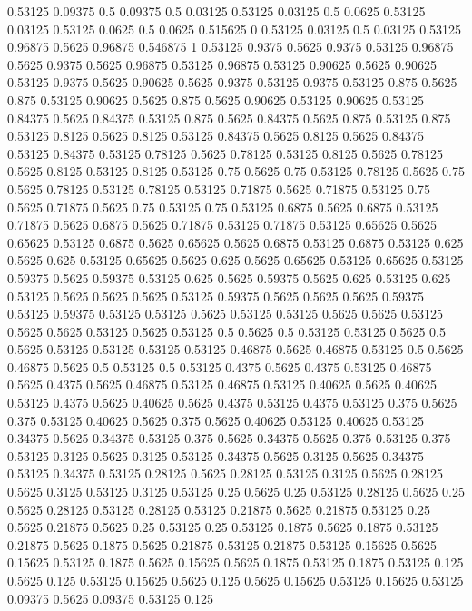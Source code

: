 0.53125 0.09375
0.5 0.09375
0.5 0.03125
0.53125 0.03125
0.5 0.0625
0.53125 0.03125
0.53125 0.0625
0.5 0.0625
0.515625 0
0.53125 0.03125
0.5 0.03125
0.53125 0.96875
0.5625 0.96875
0.546875 1
0.53125 0.9375
0.5625 0.9375
0.53125 0.96875
0.5625 0.9375
0.5625 0.96875
0.53125 0.96875
0.53125 0.90625
0.5625 0.90625
0.53125 0.9375
0.5625 0.90625
0.5625 0.9375
0.53125 0.9375
0.53125 0.875
0.5625 0.875
0.53125 0.90625
0.5625 0.875
0.5625 0.90625
0.53125 0.90625
0.53125 0.84375
0.5625 0.84375
0.53125 0.875
0.5625 0.84375
0.5625 0.875
0.53125 0.875
0.53125 0.8125
0.5625 0.8125
0.53125 0.84375
0.5625 0.8125
0.5625 0.84375
0.53125 0.84375
0.53125 0.78125
0.5625 0.78125
0.53125 0.8125
0.5625 0.78125
0.5625 0.8125
0.53125 0.8125
0.53125 0.75
0.5625 0.75
0.53125 0.78125
0.5625 0.75
0.5625 0.78125
0.53125 0.78125
0.53125 0.71875
0.5625 0.71875
0.53125 0.75
0.5625 0.71875
0.5625 0.75
0.53125 0.75
0.53125 0.6875
0.5625 0.6875
0.53125 0.71875
0.5625 0.6875
0.5625 0.71875
0.53125 0.71875
0.53125 0.65625
0.5625 0.65625
0.53125 0.6875
0.5625 0.65625
0.5625 0.6875
0.53125 0.6875
0.53125 0.625
0.5625 0.625
0.53125 0.65625
0.5625 0.625
0.5625 0.65625
0.53125 0.65625
0.53125 0.59375
0.5625 0.59375
0.53125 0.625
0.5625 0.59375
0.5625 0.625
0.53125 0.625
0.53125 0.5625
0.5625 0.5625
0.53125 0.59375
0.5625 0.5625
0.5625 0.59375
0.53125 0.59375
0.53125 0.53125
0.5625 0.53125
0.53125 0.5625
0.5625 0.53125
0.5625 0.5625
0.53125 0.5625
0.53125 0.5
0.5625 0.5
0.53125 0.53125
0.5625 0.5
0.5625 0.53125
0.53125 0.53125
0.53125 0.46875
0.5625 0.46875
0.53125 0.5
0.5625 0.46875
0.5625 0.5
0.53125 0.5
0.53125 0.4375
0.5625 0.4375
0.53125 0.46875
0.5625 0.4375
0.5625 0.46875
0.53125 0.46875
0.53125 0.40625
0.5625 0.40625
0.53125 0.4375
0.5625 0.40625
0.5625 0.4375
0.53125 0.4375
0.53125 0.375
0.5625 0.375
0.53125 0.40625
0.5625 0.375
0.5625 0.40625
0.53125 0.40625
0.53125 0.34375
0.5625 0.34375
0.53125 0.375
0.5625 0.34375
0.5625 0.375
0.53125 0.375
0.53125 0.3125
0.5625 0.3125
0.53125 0.34375
0.5625 0.3125
0.5625 0.34375
0.53125 0.34375
0.53125 0.28125
0.5625 0.28125
0.53125 0.3125
0.5625 0.28125
0.5625 0.3125
0.53125 0.3125
0.53125 0.25
0.5625 0.25
0.53125 0.28125
0.5625 0.25
0.5625 0.28125
0.53125 0.28125
0.53125 0.21875
0.5625 0.21875
0.53125 0.25
0.5625 0.21875
0.5625 0.25
0.53125 0.25
0.53125 0.1875
0.5625 0.1875
0.53125 0.21875
0.5625 0.1875
0.5625 0.21875
0.53125 0.21875
0.53125 0.15625
0.5625 0.15625
0.53125 0.1875
0.5625 0.15625
0.5625 0.1875
0.53125 0.1875
0.53125 0.125
0.5625 0.125
0.53125 0.15625
0.5625 0.125
0.5625 0.15625
0.53125 0.15625
0.53125 0.09375
0.5625 0.09375
0.53125 0.125
